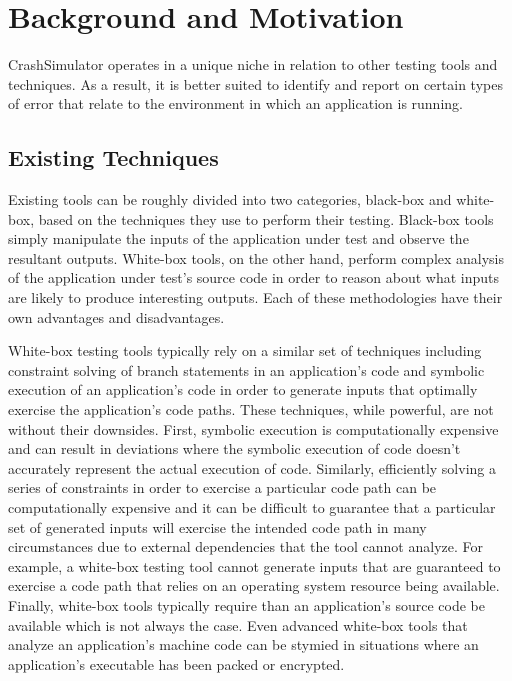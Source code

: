 
\section{Background and Motivation}

    CrashSimulator operates in a unique niche in relation to other testing tools and techniques. As a result, it is
    better suited to identify and report on certain types of error that relate to the environment in which an
    application is running.

    \subsection{Existing Techniques}

        Existing tools can be roughly divided into two categories, black-box and white-box, based on the techniques they
        use to perform their testing. Black-box tools simply manipulate the inputs of the application under test and
        observe the resultant outputs. White-box tools, on the other hand, perform complex analysis of the application
        under test's source code in order to reason about what inputs are likely to produce interesting outputs. Each of
        these methodologies have their own advantages and disadvantages.

        White-box testing tools typically rely on a similar set of techniques including constraint solving of branch
        statements in an application's code and symbolic execution of an application's code in order to generate inputs
        that optimally exercise the application's code paths. These techniques, while powerful, are not without their
        downsides.  First, symbolic execution is computationally expensive and can result in deviations where the
        symbolic execution of code doesn't accurately represent the actual execution of code.  Similarly, efficiently
        solving a series of constraints in order to exercise a particular code path can be computationally expensive and
        it can be difficult to guarantee that a particular set of generated inputs will exercise the intended code path
        in many circumstances due to external dependencies that the tool cannot analyze. For example, a white-box
        testing tool cannot generate inputs that are guaranteed to exercise a code path that relies on an operating
        system resource being available. Finally, white-box tools typically require than an application's source code be
        available which is not always the case. Even advanced white-box tools that analyze an application's machine code
        can be stymied in situations where an application's executable has been packed or encrypted.


